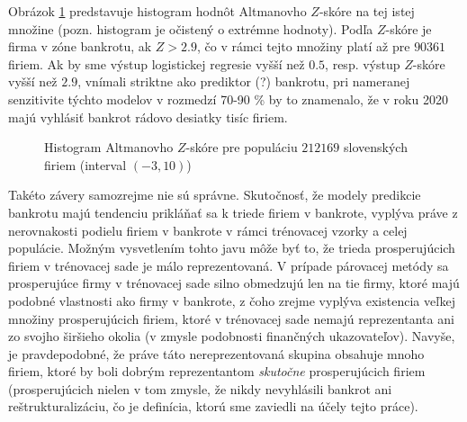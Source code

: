 Obrázok \ref{altman_whole_pop} predstavuje histogram hodnôt Altmanovho \(Z\)-skóre na tej istej množine (pozn. histogram je očistený o extrémne hodnoty).
Podľa \(Z\)-skóre je firma v zóne bankrotu, ak \(Z > 2.9\), čo v rámci tejto množiny platí až pre \(90361\) firiem.
Ak by sme výstup logistickej regresie vyšší než \(0.5\), resp. výstup \(Z\)-skóre vyšší než \(2.9\), vnímali striktne ako prediktor (?) bankrotu,
pri nameranej senzitivite týchto modelov v rozmedzí 70-90 \% by to znamenalo, že v roku 2020 majú vyhlásiť bankrot rádovo desiatky tisíc firiem.

\begin{figure}
\caption{Histogram Altmanovho \(Z\)-skóre pre populáciu \(212169\) slovenských firiem (interval \((-3, 10)\))}
\label{altman_whole_pop}
\end{figure}

Takéto závery samozrejme nie sú správne. Skutočnosť, že modely predikcie bankrotu majú tendenciu prikláňať sa k triede firiem v bankrote,
vyplýva práve z nerovnakosti podielu firiem v bankrote v rámci trénovacej vzorky a celej populácie.
Možným vysvetlením tohto javu môže byť to, že trieda prosperujúcich firiem v trénovacej sade je málo reprezentovaná.
V prípade párovacej metódy sa prosperujúce firmy v trénovacej sade silno obmedzujú len na tie firmy, ktoré majú podobné vlastnosti ako firmy v bankrote,
z čoho zrejme vyplýva existencia veľkej množiny prosperujúcich firiem, ktoré v trénovacej sade nemajú reprezentanta ani zo svojho širšieho okolia (v zmysle podobnosti finančných ukazovateľov).
Navyše, je pravdepodobné, že práve táto nereprezentovaná skupina obsahuje mnoho firiem, ktoré by boli dobrým reprezentantom \emph{skutočne} prosperujúcich firiem
(prosperujúcich nielen v tom zmysle, že nikdy nevyhlásili bankrot ani reštrukturalizáciu, čo je definícia, ktorú sme zaviedli na účely tejto práce).

